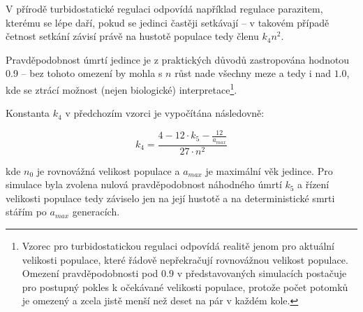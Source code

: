 V přírodě turbidostatické regulaci odpovídá například regulace parazitem, kterému se lépe daří,
pokud se jedinci častěji setkávají -- v takovém případě četnost setkání závisí právě na hustotě populace tedy členu
$k_4 n^2$.

Pravděpodobnost úmrtí jedince je z praktických důvodů zastropována hodnotou 0.9 --
bez tohoto omezení by mohla s $n$ růst nade všechny meze a tedy i nad $1.0$,
kde se ztrácí možnost (nejen biologické) interpretace\footnote{
Vzorec pro turbidostatickou regulaci odpovídá realitě jenom pro aktuální velikosti populace,
které řádově nepřekračují rovnovážnou velikost populace. Omezení pravděpodobnosti pod $0.9$ v představovaných
simulacích postačuje pro postupný pokles k očekávané velikosti populace, protože počet potomků je omezený a
zcela jistě menší než deset na pár v každém kole.
}.

Konstanta $k_4$ v předchozím vzorci je vypočítána následovně:

\begin{equation}
k_4 = \frac{4 - 12\cdot{}{k_5} - \frac{12}{a_{max}}}
           {27\cdot{}n^2}
\end{equation}


kde $n_0$ je rovnovážná velikost populace a $a_{max}$ je maximální věk jedince.
Pro simulace byla zvolena nulová pravděpodobnost náhodného úmrtí $k_5$ a řízení velikosti populace tedy záviselo jen na
její hustotě a na deterministické smrti stářím po $a_{max}$ generacích.

\vspace{1em}


